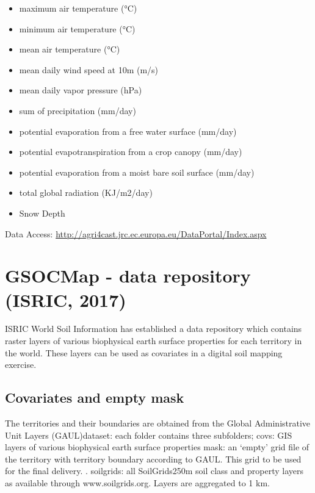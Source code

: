\documentclass[10pt,b5paper,]{book}
\providecommand{\tightlist}{%
  \setlength{\itemsep}{0pt}\setlength{\parskip}{0pt}}
\theoremstyle{definition}
\theoremstyle{definition}
\theoremstyle{definition}
\theoremstyle{remark}
\begin{document}
\begin{itemize}
\tightlist
\item
  maximum air temperature (°C)
\item
  minimum air temperature (°C)
\item
  mean air temperature (°C)
\item
  mean daily wind speed at 10m (m/s)
\item
  mean daily vapor pressure (hPa)
\item
  sum of precipitation (mm/day)
\item
  potential evaporation from a free water surface (mm/day)
\item
  potential evapotranspiration from a crop canopy (mm/day)
\item
  potential evaporation from a moist bare soil surface (mm/day)
\item
  total global radiation (KJ/m2/day)
\item
  Snow Depth
\end{itemize}

Data Access:
\url{http://agri4cast.jrc.ec.europa.eu/DataPortal/Index.aspx}

\hypertarget{GSOCDataRepo}{%
\section{GSOCMap - data repository (ISRIC, 2017)}\label{GSOCDataRepo}}

ISRIC World Soil Information has established a data repository which
contains raster layers of various biophysical earth surface properties
for each territory in the world. These layers can be used as covariates
in a digital soil mapping exercise.

\hypertarget{covariates-and-empty-mask}{%
\subsection{Covariates and empty mask}\label{covariates-and-empty-mask}}

The territories and their boundaries are obtained from the Global
Administrative Unit Layers (GAUL)dataset: each folder contains three
subfolders; covs: GIS layers of various biophysical earth surface
properties mask: an `empty' grid file of the territory with territory
boundary according to GAUL. This grid to be used for the final delivery.
. soilgrids: all SoilGrids250m soil class and property layers as
available through www.soilgrids.org. Layers are aggregated to 1 km.
\end{document}
